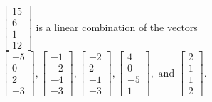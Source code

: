 \begin{exercise}
\begin{exerciseStatement}
  \end{exerciseStatement}
  \begin{exerciseAnswer}
   \(\left[\begin{array}{c}
15 \\
6 \\
1 \\
12
\end{array}\right]\) 
  	 is  
	a linear combination of the vectors \(\left[\begin{array}{c}
-5 \\
0 \\
2 \\
-3
\end{array}\right] , \left[\begin{array}{c}
-1 \\
-2 \\
-4 \\
-3
\end{array}\right] , \left[\begin{array}{c}
-2 \\
2 \\
-1 \\
-3
\end{array}\right] , \left[\begin{array}{c}
4 \\
0 \\
-5 \\
1
\end{array}\right] , \text{ and } \left[\begin{array}{c}
2 \\
1 \\
1 \\
2
\end{array}\right]\).

	
  


  \end{exerciseAnswer}
\end{exercise}